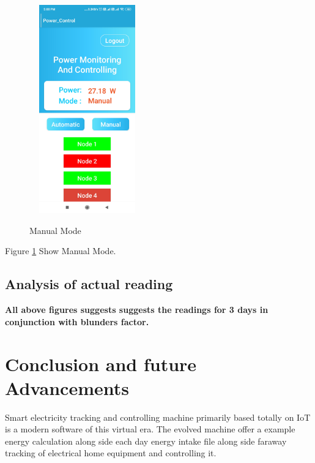 \documentclass[12pt,a4paper]{article}
\begin{document}
\begin{figure}[H]
	\centering
	\includegraphics[width=5cm, height=9cm]{appi5.jpg}\\
	\caption{Manual Mode}
	\label{fig:6.2.4}
\end{figure}
\begin{center}
Figure \ref{fig:6.2.4} Show Manual Mode.
\end{center}

\subsection{Analysis of actual reading}
\vspace{0.1in}
\textbf{\large{All above figures suggests suggests the readings for 3 days in conjunction with blunders factor.}}\\


\newpage
\pagebreak
\vspace*{\fill}%
\noindent
{}
\vfill


\newpage
\section{Conclusion and future Advancements}
\fancyfoot[R]{\thepage}

\hspace{0.5cm}Smart electricity tracking and controlling machine primarily based totally on IoT is a modern software of this virtual era. The evolved machine offer a example energy calculation along side each day energy intake file along side faraway tracking of electrical home equipment and controlling it.\\
\end{document}

